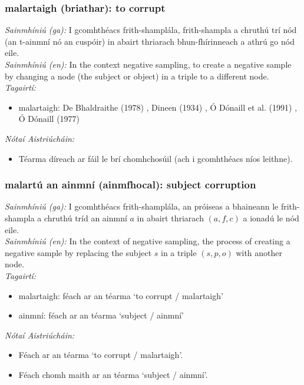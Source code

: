 \subsubsection*{malartaigh (briathar): to corrupt}
 \noindent \textit{Sainmhíniú (ga):} I gcomhthéacs frith-shamplála, frith-shampla a chruthú trí nód (an t-ainmní nó an cuspóir) in abairt thriarach bhun-fhírinneach a athrú go nód eile.
\\
 \noindent \textit{Sainmhíniú (en):} In the context negative sampling, to create a negative sample by changing a node (the subject or object) in a triple to a different node.
\\
 \noindent \textit{Tagairtí:}
\begin{itemize}
	\item malartaigh: De Bhaldraithe (1978) \cite{de-bhaldraithe}, Dineen (1934) \cite{dineen}, Ó Dónaill et al. (1991) \cite{focloir-beag}, Ó Dónaill (1977) \cite{odonaill}
\end{itemize}

 \noindent \textit{Nótaí Aistriúcháin:}
\begin{itemize}
	\item Téarma díreach ar fáil le brí chomhchosúil (ach i gcomhthéacs níos leithne).
\end{itemize}


\subsubsection*{malartú an ainmní (ainmfhocal): subject corruption}
 \noindent \textit{Sainmhíniú (ga):} I gcomhthéacs frith-shamplála, an próiseas a bhaineann le frith-shampla a chruthú tríd an ainmní $a$ in abairt thriarach $(a,f,c)$ a ionadú le nód eile.
\\
 \noindent \textit{Sainmhíniú (en):} In the context of negative sampling, the process of creating a negative sample by replacing the subject $s$ in a triple $(s,p,o)$ with another node.
\\
 \noindent \textit{Tagairtí:}
\begin{itemize}
	\item malartaigh: féach ar an téarma `to corrupt / malartaigh'
	\item ainmní: féach ar an téarma `subject / ainmní'
\end{itemize}

 \noindent \textit{Nótaí Aistriúcháin:}
\begin{itemize}
	\item Féach ar an téarma `to corrupt / malartaigh'.
	\item Féach chomh maith ar an téarma `subject / ainmní'.
\end{itemize}


